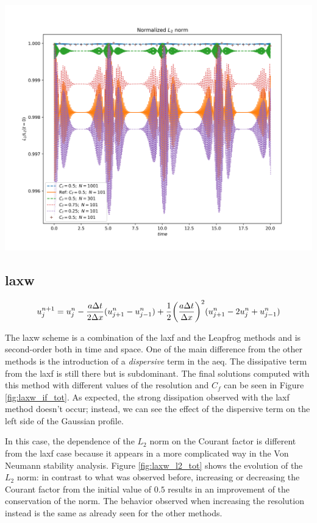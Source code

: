 \documentclass[11pt, a4paper]{article}
\begin{document}
\begin{center}
    \centering
    \includegraphics[width=0.9\linewidth]{images/L2_GAUS_LEAPFROG.png}
    \label{fig:leapfrog_l2_tot}
\end{center}

\subsection{\acrfull{laxw}}

\begin{equation} \label{eq:lax-w}
    u^{n+1}_j = u^n_j - \frac{a \Delta t}{2 \Delta x} (u^n_{j+1} - u^n_{j-1}) + \frac{1}{2}\qty(\frac{a \Delta t}{\Delta x})^2 (u^n_{j+1} - 2u^n_j + u^n_{j-1})
\end{equation}

The \acrshort{laxw} scheme is a combination of the \acrshort{laxf} and the Leapfrog methods and is second-order both in time and space. One of the main difference from the other methods is the introduction of a \textit{dispersive} term in the \acrshort{aeq}. The dissipative term from the \acrshort{laxf} is still there but is subdominant. The final solutions computed with this method with different values of the resolution and \(C_f\) can be seen in Figure \ref{fig:laxw_if_tot}. As expected, the strong dissipation observed with the \acrshort{laxf} method doesn't occur; instead, we can see the effect of the dispersive term on the left side of the Gaussian profile.

In this case, the dependence of the \(L_2\) norm on the Courant factor is different from the \acrshort{laxf} case because it appears in a more complicated way in the Von Neumann stability analysis. Figure \ref{fig:laxw_l2_tot} shows the evolution of the \(L_2\) norm: in contrast to what was observed before, increasing or decreasing the Courant factor from the initial value of \(0.5\) results in an improvement of the conservation of the norm. The behavior observed when increasing the resolution instead is the same as already seen for the other methods.
\end{document}
